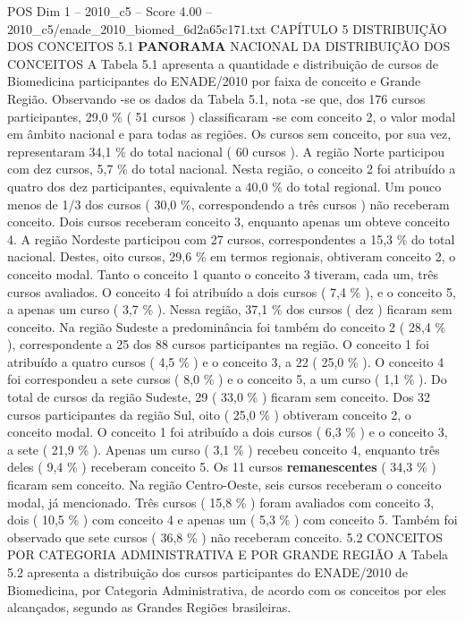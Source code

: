 \begin{textsample}{POS Dim 1 – 2010\_c5 – Score 4.00 – 2010\_c5/enade\_2010\_biomed\_6d2a65c171.txt}  \label{ex:f1_pos_132}
CAPÍTULO 5 DISTRIBUIÇÃO DOS CONCEITOS 5.1 \textbf{PANORAMA} NACIONAL DA DISTRIBUIÇÃO DOS CONCEITOS A Tabela 5.1 apresenta a quantidade e distribuição de cursos de Biomedicina participantes do ENADE/2010 por faixa de conceito e Grande Região.
Observando -se os dados da Tabela 5.1, nota -se que, dos 176 cursos participantes, 29,0 \% ( 51 cursos ) classificaram -se com conceito 2, o valor modal em âmbito nacional e para todas as regiões.
Os cursos sem conceito, por sua vez, representaram 34,1 \% do total nacional ( 60 cursos ).
A região Norte participou com dez cursos, 5,7 \% do total nacional.
Nesta região, o conceito 2 foi atribuído a quatro dos dez participantes, equivalente a 40,0 \% do total regional.
Um pouco menos de 1/3 dos cursos ( 30,0 \%, correspondendo a três cursos ) não receberam conceito.
Dois cursos receberam conceito 3, enquanto apenas um obteve conceito 4.
A região Nordeste participou com 27 cursos, correspondentes a 15,3 \% do total nacional.
Destes, oito cursos, 29,6 \% em termos regionais, obtiveram conceito 2, o conceito modal.
Tanto o conceito 1 quanto o conceito 3 tiveram, cada um, três cursos avaliados.
O conceito 4 foi atribuído a dois cursos ( 7,4 \% ), e o conceito 5, a apenas um curso ( 3,7 \% ).
Nessa região, 37,1 \% dos cursos ( dez ) ficaram sem conceito.
Na região Sudeste a predominância foi também do conceito 2 ( 28,4 \% ), correspondente a 25 dos 88 cursos participantes na região.
O conceito 1 foi atribuído a quatro cursos ( 4,5 \% ) e o conceito 3, a 22 ( 25,0 \% ).
O conceito 4 foi correspondeu a sete cursos ( 8,0 \% ) e o conceito 5, a um curso ( 1,1 \% ).
Do total de cursos da região Sudeste, 29 ( 33,0 \% ) ficaram sem conceito.
Dos 32 cursos participantes da região Sul, oito ( 25,0 \% ) obtiveram conceito 2, o conceito modal.
O conceito 1 foi atribuído a dois cursos ( 6,3 \% ) e o conceito 3, a sete ( 21,9 \% ).
Apenas um curso ( 3,1 \% ) recebeu conceito 4, enquanto três deles ( 9,4 \% ) receberam conceito 5.
Os 11 cursos \textbf{remanescentes} ( 34,3 \% ) ficaram sem conceito.
Na região Centro-Oeste, seis cursos receberam o conceito modal, já mencionado.
Três cursos ( 15,8 \% ) foram avaliados com conceito 3, dois ( 10,5 \% ) com conceito 4 e apenas um ( 5,3 \% ) com conceito 5.
Também foi observado que sete cursos ( 36,8 \% ) não receberam conceito. 5.2 CONCEITOS POR CATEGORIA ADMINISTRATIVA E POR GRANDE REGIÃO A Tabela 5.2 apresenta a distribuição dos cursos participantes do ENADE/2010 de Biomedicina, por Categoria Administrativa, de acordo com os conceitos por eles alcançados, segundo as Grandes Regiões brasileiras.

\end{textsample}
